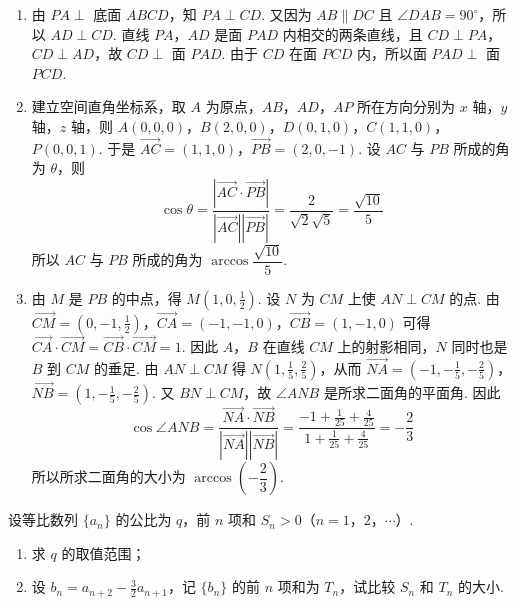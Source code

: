 \begin{solution}
\begin{enumerate}
\item 由 \(PA\perp\) 底面 \(ABCD\)，知 \(PA\perp CD\). 又因为 \(AB\parallel DC\) 且 \(\angle DAB=90^{\circ}\)，所以 \(AD\perp CD\). 直线 \(PA\)，\(AD\) 是面 \(PAD\) 内相交的两条直线，且 \(CD\perp PA\)，\(CD\perp AD\)，故 \(CD\perp\) 面 \(PAD\). 由于 \(CD\) 在面 \(PCD\) 内，所以面 \(PAD\perp\) 面 \(PCD\).
\item 建立空间直角坐标系，取 \(A\) 为原点，\(AB\)，\(AD\)，\(AP\) 所在方向分别为 \(x\) 轴，\(y\) 轴，\(z\) 轴，则 \(A(0,0,0)\)，\(B(2,0,0)\)，\(D(0,1,0)\)，\(C(1,1,0)\)，\(P(0,0,1)\). 于是
\(\overrightarrow{AC}=(1,1,0)\)，\(\overrightarrow{PB}=(2,0,-1)\).
设 \(AC\) 与 \(PB\) 所成的角为 \(\theta\)，则
\[
\cos\theta=\frac{\left|\overrightarrow{AC}\cdot\overrightarrow{PB}\right|}{\left|\overrightarrow{AC}\right|\left|\overrightarrow{PB}\right|}=\frac{2}{\sqrt{2}\sqrt{5}}=\frac{\sqrt{10}}{5}
\]
所以 \(AC\) 与 \(PB\) 所成的角为 \(\arccos\dfrac{\sqrt{10}}{5}\).
\item 由 \(M\) 是 \(PB\) 的中点，得 \(M(1,0,\frac{1}{2})\). 设 \(N\) 为 \(CM\) 上使 \(AN\perp CM\) 的点. 由
\(\overrightarrow{CM}=(0,-1,\tfrac{1}{2})\)，\(\overrightarrow{CA}=(-1,-1,0)\)，\(\overrightarrow{CB}=(1,-1,0)\)
可得 \(\overrightarrow{CA}\cdot\overrightarrow{CM}=\overrightarrow{CB}\cdot\overrightarrow{CM}=1\). 因此 \(A\)，\(B\) 在直线 \(CM\) 上的射影相同，\(N\) 同时也是 \(B\) 到 \(CM\) 的垂足. 由 \(AN\perp CM\) 得 \(N(1,\frac{1}{5},\frac{2}{5})\)，从而
\(\overrightarrow{NA}=(-1,-\tfrac{1}{5},-\tfrac{2}{5})\)，\(\overrightarrow{NB}=(1,-\tfrac{1}{5},-\tfrac{2}{5})\).
又 \(BN\perp CM\)，故 \(\angle ANB\) 是所求二面角的平面角. 因此
\[
\cos\angle ANB=\frac{\overrightarrow{NA}\cdot\overrightarrow{NB}}{\left|\overrightarrow{NA}\right|\left|\overrightarrow{NB}\right|}=\frac{-1+\frac{1}{25}+\frac{4}{25}}{1+\frac{1}{25}+\frac{4}{25}}=-\frac{2}{3}
\]
所以所求二面角的大小为 \(\arccos\left(-\dfrac{2}{3}\right)\).
\end{enumerate}
\end{solution}

\begin{problem}
设等比数列 \(\{a_{n}\}\) 的公比为 \(q\)，前 \(n\) 项和 \(S_{n} > 0\)（\(n = 1\)，\(2\)，\(\cdots\)）.

\begin{enumerate}
\item 求 \(q\) 的取值范围；
\item 设 \(b_{n} = a_{n+2} - \frac{3}{2} a_{n+1}\)，记 \(\{b_{n}\}\) 的前 \(n\) 项和为 \(T_{n}\)，试比较 \(S_{n}\) 和 \(T_{n}\) 的大小.
\end{enumerate}
\end{problem}

